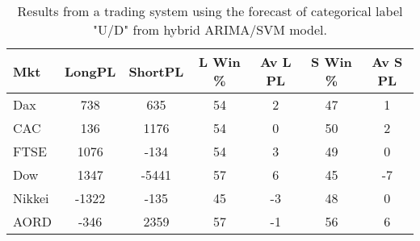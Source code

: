 \begin{table}[ht]
\centering
\caption[Results from a trading system using the forecast of categorical label "U/D" from hybrid ARIMA/SVM model]{Results from a trading system using the forecast of categorical label "U/D" from hybrid ARIMA/SVM model.} 
\label{tab:chp_ts:pUD_CAT_arima_svm_sys_ch6}
\begin{tabular}{lcccccc}
  \toprule Mkt & LongPL & ShortPL & L Win \% & Av L PL & S Win \% & Av S PL \\ 
  \midrule Dax & 738 & 635 & 54 & 2 & 47 & 1 \\ 
  CAC & 136 & 1176 & 54 & 0 & 50 & 2 \\ 
  FTSE & 1076 & -134 & 54 & 3 & 49 & 0 \\ 
  Dow & 1347 & -5441 & 57 & 6 & 45 & -7 \\ 
  Nikkei & -1322 & -135 & 45 & -3 & 48 & 0 \\ 
  AORD & -346 & 2359 & 57 & -1 & 56 & 6 \\ 
   \bottomrule \end{tabular}
\end{table}
